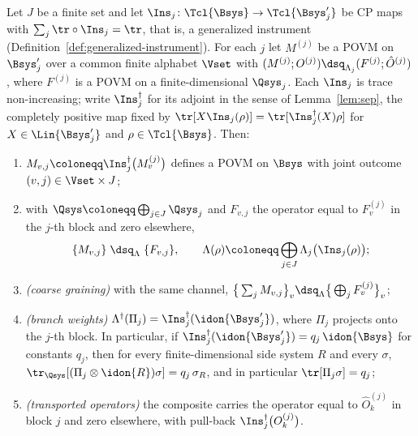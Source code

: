 \begin{lemma}\label{lem:master}
Let $J$ be a finite set and let $\Ins_j\colon\Tcl{\Bsys}\to\Tcl{\Bsys'_j}$ be
CP maps with $\sum_{j}\tr\circ\Ins_j=\tr$, that is, a generalized instrument
(Definition~\ref{def:generalized-instrument}). For each $j$ let $M^{(j)}$ be a
POVM on $\Bsys'_j$ over a common finite alphabet $\Vset$ with
$(M^{(j)};O^{(j)})\dsq_{\Lambda_j}(F^{(j)};\hat O^{(j)})$, where $F^{(j)}$ is a
POVM on a finite-dimensional $\Qsys_j$. Each $\Ins_j$ is trace
non-increasing; write $\Ins_j^{\dagger}$ for its adjoint in the sense of
Lemma~\ref{lem:sep}, the completely positive map fixed by
$\tr[X\Ins_j(\rho)]=\tr[\Ins_j^{\dagger}(X)\rho]$ for $X\in\Lin{\Bsys'_j}$ and
$\rho\in\Tcl{\Bsys}$. Then:
\begin{enumerate}[label=(\roman*),leftmargin=3.0em]
\item $M_{v,j}\coloneqq\Ins_j^{\dagger}\big(M^{(j)}_v\big)$ defines a POVM on
  $\Bsys$ with joint outcome $(v,j)\in\Vset\times J$;
\item with $\Qsys\coloneqq\bigoplus_{j\in J}\Qsys_j$ and $F_{v,j}$ the operator
  equal to $F^{(j)}_v$ in the $j$-th block and zero elsewhere,
  \begin{equation}\label{eq:master}
    \{M_{v,j}\}\;\dsq_{\Lambda}\;\{F_{v,j}\},
    \qquad
    \Lambda(\rho)\coloneqq\bigoplus_{j\in J}\Lambda_j\big(\Ins_j(\rho)\big);
  \end{equation}
\item \emph{(coarse graining)} with the same channel,
  $\big\{\sum_jM_{v,j}\big\}_v\dsq_{\Lambda}
   \big\{\bigoplus_jF^{(j)}_v\big\}_v$;
\item \emph{(branch weights)} $\Lambda^{\dagger}(\Pi_j)
  =\Ins_j^{\dagger}(\idon{\Bsys'_j})$, where $\Pi_j$ projects onto the $j$-th
  block. In particular, if $\Ins_j^{\dagger}(\idon{\Bsys'_j})=q_j\,\idon{\Bsys}$
  for constants $q_j$, then for every finite-dimensional side system $R$ and
  every  $\sigma$,
  $\tr_{\Qsys}[(\Pi_j\otimes\idon{R})\sigma]=q_j\,\sigma_R$, and in particular
  $\tr[\Pi_j\sigma]=q_j$;
\item \emph{(transported operators)} the composite carries the operator equal
  to $\hat O^{(j)}_k$ in block $j$ and zero elsewhere, with pull-back
  $\Ins_j^{\dagger}\big(O^{(j)}_k\big)$.
\end{enumerate}
\end{lemma}

